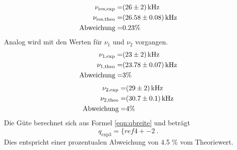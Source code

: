 \begin{eqnarray}
  \nu_\text{res,exp} =&  (\num{26 +- 2}) \, \text{kHz}			\\
  \nu_\text{res,theo} =& (\num{26.58 +- 0.08}) \, \text{kHz} \\
  \text{Abweichung} =& 0.23 \%
  \label{eqn:res}
\end{eqnarray}
Analog wird mit den Werten für $\nu_1$ und $\nu_2$ vorgangen.
\begin{eqnarray}
  \nu_\text{1,exp} =&  (\num{23 +- 2}) \, \text{kHz}                 \\
  \nu_\text{1,theo} =& (\num{23.78 +- 0.07}) \, \text{kHz} \\
  \text{Abweichung} =& 3 \%
\end{eqnarray}
\begin{eqnarray}
  \nu_\text{2,exp} =&  (\num{29 +- 2}) \, \text{kHz}                 \\
  \nu_\text{2,theo} =& (\num{30.7 +- 0.1}) \, \text{kHz} \\
  \text{Abweichung} =& 4 \%
\end{eqnarray}
Die Güte berechnet sich aus Formel \ref{eqn:qbreite} und beträgt
\begin{equation}
  q_\text{exp3} = \{ref{4 +- 2}  \ .
  \label{eqn:q3}
\end{equation}
Dies entspricht einer prozentualen Abweichung von 4.5 \% vom Theoriewert.

